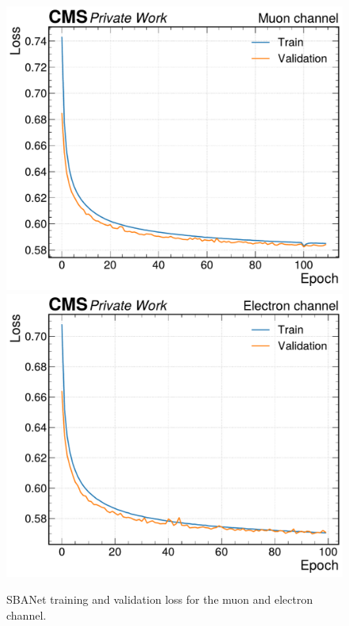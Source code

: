\begin{figure}[H]
    \centering
    \includegraphics[height=0.48\textheight]{fig//chap09-sigback/loss_Muon.pdf}
    \includegraphics[height=0.48\textheight]{fig//chap09-sigback/loss_Electron.pdf}
    \caption{SBANet training and validation loss for the muon and electron channel.}
    \label{fig:SBANET_loss}
\end{figure}


